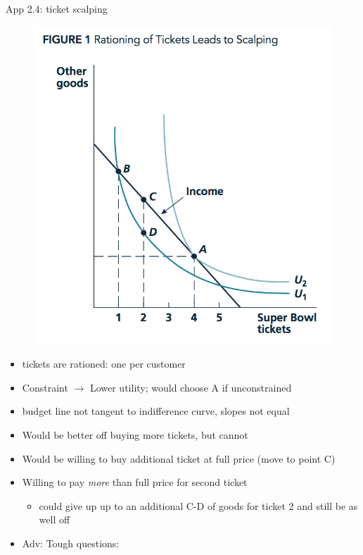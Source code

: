 \documentclass[table]{beamer}
\providecommand{\tightlist}{%
  \setlength{\itemsep}{0pt}\setlength{\parskip}{0pt}}
\begin{document}
\begin{frame}{App 2.4: ticket scalping}
\protect\hypertarget{app-2.4-ticket-scalping}{}

\begin{figure}

{\centering \includegraphics[width=0.6\linewidth]{picsfigs/scalping} 

}

\end{figure}

\begin{itemize}
\item
  tickets are rationed: one per customer
\item
  Constraint \(\rightarrow\) Lower utility; would choose A if
  unconstrained
\item
  budget line not tangent to indifference curve, slopes not equal
\item
  Would be better off buying more tickets, but cannot
\item
  Would be willing to buy additional ticket at full price (move to point
  C)
\item
  Willing to pay \emph{more} than full price for second ticket

  \begin{itemize}
  \tightlist
  \item
    could give up up to an additional C-D of goods for ticket 2 and
    still be as well off
  \end{itemize}
\end{itemize}

\begin{itemize}
\item
  Adv: Tough questions:


\end{itemize}
\end{frame}
\end{document}
